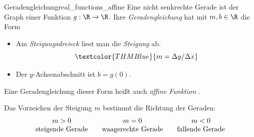 \begin{DefinitionBox}{Geradengleichung}{real_functions_affine}
  Eine nicht senkrechte Gerade ist der Graph einer Funktion
  $g:\R\to\R$. Ihre \emph{Geradengleichung}
  hat mit $m,b\in\R$ die Form
  \par\smallskip
  \begin{minipage}[c]{0.47\linewidth}
    {\centering
      \par}
    \smallskip\noindent\raggedright
    \begin{itemize}[leftmargin=1.3em,itemsep=0.4em,topsep=0.3em]
      \item Am \textcolor{THMBlue}{\emph{Steigungsdreieck}}
         liest man die \emph{Steigung}
         ab.
        \[
          \textcolor{THMBlue}{m=\Delta y/\Delta x}
        \]
      \item Der \textcolor{green!55!black}{$y$-Achsenabschnitt ist $b=g(0)$}.
    \end{itemize}
  \end{minipage}\hfill
  \begin{minipage}[c]{0.51\linewidth}
    \centering
  \end{minipage}
\end{DefinitionBox}
Eine Geradengleichung dieser Form heißt auch \emph{affine Funktion} .


Das Vorzeichen der Steigung $m$ bestimmt die Richtung der Geraden:
\[
  \begin{array}{c@{\qquad}c@{\qquad}c}
    m>0&m=0&m<0\\
    \text{steigende Gerade}&\text{waagerechte Gerade}&\text{fallende Gerade}
  \end{array}
\]

